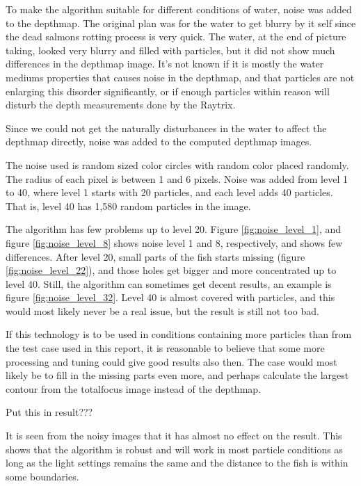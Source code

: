 To make the algorithm suitable for different conditions of water, noise was added to the depthmap.
The original plan was for the water to get blurry by it self since the dead salmons rotting process is very quick. The water, at the end of picture taking, looked very blurry and filled with particles, but it did not show much differences in the depthmap image. It's not known if it is mostly the water mediums properties that causes noise in the depthmap, and that particles are not enlarging this disorder significantly, or if enough particles within reason will disturb the depth measurements done by the Raytrix.

Since we could not get the naturally disturbances in the water to affect the depthmap directly, noise was added to the computed depthmap images.

The noise used is random sized color circles with random color placed randomly. The radius of each pixel is between 1 and 6 pixels. Noise was added from level 1 to 40, where level 1 starts with 20 particles, and each level adds 40 particles. That is, level 40 has 1,580 random particles in the image.

The algorithm has few problems up to level 20. Figure \ref{fig:noise_level_1}, and figure \ref{fig:noise_level_8} shows noise level 1 and 8, respectively, and shows few differences. After level 20, small parts of the fish starts missing (figure \ref{fig:noise_level_22}), and those holes get bigger and more concentrated up to level 40. Still, the algorithm can sometimes get decent results, an example is figure \ref{fig:noise_level_32}. Level 40 is almost covered with particles, and this would most likely never be a real issue, but the result is still not too bad.

If this technology is to be used in conditions containing more particles than from the test case used in this report, it is reasonable to believe that some more processing and tuning could give good results also then. The case would most likely be to fill in the missing parts even more, and perhaps calculate the largest contour from the totalfocus image instead of the depthmap. 





{\color{red} Put this in result???

It is seen from the noisy images that it has almost no effect on the result. This shows that the algorithm is robust and will work in most particle conditions as long as the light settings remains the same and the distance to the fish is within some boundaries. }



